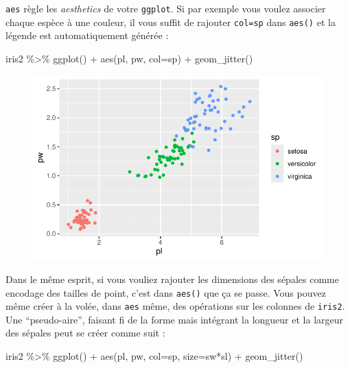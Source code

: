 \documentclass[
  letterpaper,
  DIV=11,
  numbers=noendperiod]{scrreprt}
\newenvironment{Shaded}{\begin{snugshade}}{\end{snugshade}}
\newcommand{\AttributeTok}[1]{\textcolor[rgb]{0.40,0.45,0.13}{#1}}
\newcommand{\FunctionTok}[1]{\textcolor[rgb]{0.28,0.35,0.67}{#1}}
\newcommand{\NormalTok}[1]{\textcolor[rgb]{0.00,0.23,0.31}{#1}}
\newcommand{\SpecialCharTok}[1]{\textcolor[rgb]{0.37,0.37,0.37}{#1}}
\begin{document}
\texttt{aes} règle les \emph{aesthetics} de votre \texttt{ggplot}. Si
par exemple vous voulez associer chaque espèce à une couleur, il vous
suffit de rajouter \texttt{col=sp} dans \texttt{aes()} et la légende est
automatiquement générée :

\begin{Shaded}
\begin{Highlighting}[]
\NormalTok{iris2 }\SpecialCharTok{\%\textgreater{}\%} \FunctionTok{ggplot}\NormalTok{() }\SpecialCharTok{+} 
  \FunctionTok{aes}\NormalTok{(pl, pw, }\AttributeTok{col=}\NormalTok{sp) }\SpecialCharTok{+}
  \FunctionTok{geom\_jitter}\NormalTok{()}
\end{Highlighting}
\end{Shaded}

\begin{figure}[H]

{\centering \includegraphics{ggplot2_files/figure-pdf/unnamed-chunk-5-1.pdf}

}

\end{figure}

Dans le même esprit, si vous vouliez rajouter les dimensions des sépales
comme encodage des tailles de point, c'est dans \texttt{aes()} que ça se
passe. Vous pouvez même créer à la volée, dans \texttt{aes} même, des
opérations sur les colonnes de \texttt{iris2}. Une ``pseudo-aire'',
faisant fi de la forme mais intégrant la longueur et la largeur des
sépales peut se créer comme suit :

\begin{Shaded}
\begin{Highlighting}[]
\NormalTok{iris2 }\SpecialCharTok{\%\textgreater{}\%} \FunctionTok{ggplot}\NormalTok{() }\SpecialCharTok{+} 
  \FunctionTok{aes}\NormalTok{(pl, pw, }\AttributeTok{col=}\NormalTok{sp, }\AttributeTok{size=}\NormalTok{sw}\SpecialCharTok{*}\NormalTok{sl) }\SpecialCharTok{+}
  \FunctionTok{geom\_jitter}\NormalTok{()}
\end{Highlighting}
\end{Shaded}
\end{document}
